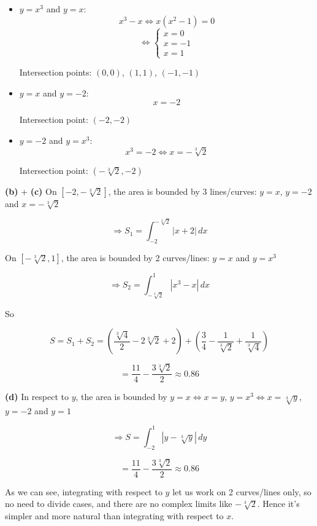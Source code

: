 \begin{itemize}
    \item $y = x^3$ and $y = x$:
    \[ x^3 - x \Leftrightarrow x(x^2 - 1) = 0 \]
    \[ \Leftrightarrow \begin{cases} x = 0 \\ x = -1 \\ x = 1 \end{cases} \]
    
    Intersection points: $(0, 0)$, $(1, 1)$, $(-1, -1)$
    
    \item $y = x$ and $y = -2$:
    \[ x = -2 \]
    
    Intersection point: $(-2, -2)$
    
    \item $y = -2$ and $y = x^3$:
    \[ x^3 = -2 \Leftrightarrow x = -\sqrt[3]{2} \]
    
    Intersection point: $(-\sqrt[3]{2}, -2)$
\end{itemize}

\textbf{(b)} + \textbf{(c)} On $[-2, -\sqrt[3]{2}]$, the area is bounded by 3 lines/curves: $y = x$, $y = -2$ and $x = -\sqrt[3]{2}$

\[ \Rightarrow S_1 = \int_{-2}^{-\sqrt[3]{2}} |x + 2| \, dx \]

On $[-\sqrt[3]{2}, 1]$, the area is bounded by 2 curves/lines: $y = x$ and $y = x^3$

\[ \Rightarrow S_2 = \int_{-\sqrt[3]{2}}^{1} |x^3 - x| \, dx \]

So 

\[ S = S_1 + S_2 = \left(\frac{\sqrt[3]{4}}{2} - 2\sqrt[3]{2} + 2\right) + \left(\frac{3}{4} - \frac{1}{\sqrt[3]{2}} + \frac{1}{\sqrt[3]{4}}\right) \]

\[ = \frac{11}{4} - \frac{3\sqrt[3]{2}}{2} \approx 0.86 \]

\textbf{(d)}  In respect to $y$, the area is bounded by $y = x \Leftrightarrow x = y$, $y = x^3 \Leftrightarrow x = \sqrt[3]{y}$, $y = -2$ and $y = 1$

\[ \Rightarrow S = \int_{-2}^{1} |y - \sqrt[3]{y}| \, dy \]

\[ = \frac{11}{4} - \frac{3\sqrt[3]{2}}{2} \approx 0.86\]

As we can see, integrating with respect to $y$ let us work on 2 curves/lines only, so no need to divide cases, and there are no complex limits like $-\sqrt[3]{2}$. Hence it's simpler and more natural than integrating with respect to $x$.

\pagebreak
